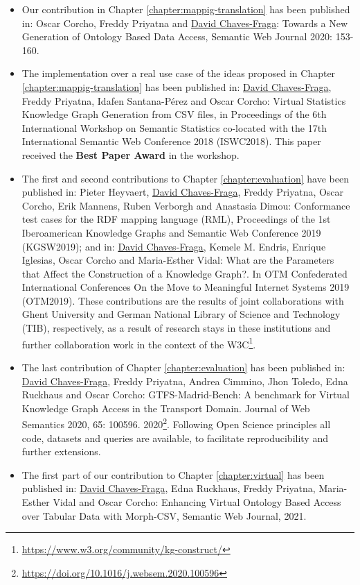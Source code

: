 \begin{itemize}
    \item Our contribution in Chapter \ref{chapter:mappig-translation} has been published in: Oscar Corcho, Freddy Priyatna and \underline{David Chaves-Fraga}: Towards a New Generation of Ontology Based Data Access, Semantic Web Journal 2020: 153-160.
    \item The implementation over a real use case of the ideas proposed in Chapter \ref{chapter:mappig-translation} has been published in: \underline{David Chaves-Fraga}, Freddy Priyatna, Idafen Santana-Pérez and Oscar Corcho: Virtual Statistics Knowledge Graph Generation from CSV files, in Proceedings of the 6th International Workshop on Semantic Statistics co-located with the 17th International Semantic Web Conference 2018 (ISWC2018). This paper received the \textbf{Best Paper Award} in the workshop.
    \item The first and second contributions to Chapter \ref{chapter:evaluation} have been published in: Pieter Heyvaert, \underline{David Chaves-Fraga}, Freddy Priyatna, Oscar Corcho, Erik Mannens, Ruben Verborgh and Anastasia Dimou: Conformance test cases for the RDF mapping language (RML), Proceedings of the 1st Iberoamerican Knowledge Graphs and Semantic Web Conference 2019 (KGSW2019); and in: \underline{David Chaves-Fraga}, Kemele M. Endris, Enrique Iglesias, Oscar Corcho and Maria-Esther Vidal: What are the Parameters that Affect the Construction of a Knowledge Graph?. In OTM Confederated International Conferences On the Move to Meaningful Internet Systems 2019 (OTM2019). These contributions are the results of joint collaborations with Ghent University and German National Library of Science and Technology (TIB), respectively, as a result of research stays in these institutions and further collaboration work in the context of the W3C\footnote{\url{https://www.w3.org/community/kg-construct/}}.
    \item The last contribution of Chapter \ref{chapter:evaluation} has been published in: \underline{David Chaves-Fraga}, Freddy Priyatna, Andrea Cimmino, Jhon Toledo, Edna Ruckhaus and Oscar Corcho: GTFS-Madrid-Bench: A benchmark for Virtual Knowledge Graph Access in the Transport Domain. Journal of Web Semantics 2020, 65: 100596. 2020\footnote{\url{https://doi.org/10.1016/j.websem.2020.100596}}. Following Open Science principles all code, datasets and queries are available, to facilitate reproducibility and further extensions.
    \item The first part of our contribution to Chapter \ref{chapter:virtual} has been published in: \underline{David Chaves-Fraga}, Edna Ruckhaus, Freddy Priyatna, Maria-Esther Vidal and Oscar Corcho: Enhancing Virtual Ontology Based Access over Tabular Data with Morph-CSV, Semantic Web Journal, 2021.

\end{itemize}

